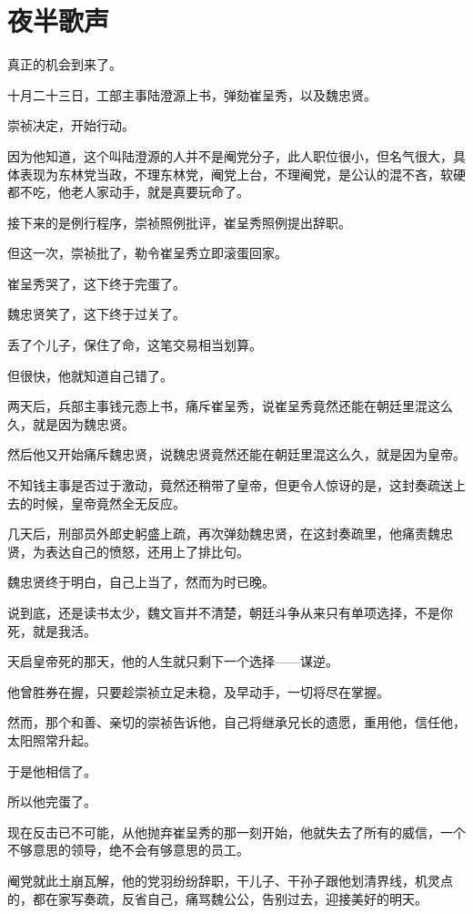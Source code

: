 \section{夜半歌声}
\ifnum{}
	\begin{multicols}{\theparacolNo}
		\fi
		真正的机会到来了。

		十月二十三日，工部主事陆澄源上书，弹劾崔呈秀，以及魏忠贤。

		崇祯决定，开始行动。

		因为他知道，这个叫陆澄源的人并不是阉党分子，此人职位很小，但名气很大，具体表现为东林党当政，不理东林党，阉党上台，不理阉党，是公认的混不吝，软硬都不吃，他老人家动手，就是真要玩命了。

		接下来的是例行程序，崇祯照例批评，崔呈秀照例提出辞职。

		但这一次，崇祯批了，勒令崔呈秀立即滚蛋回家。

		崔呈秀哭了，这下终于完蛋了。

		魏忠贤笑了，这下终于过关了。

		丢了个儿子，保住了命，这笔交易相当划算。

		但很快，他就知道自己错了。

		两天后，兵部主事钱元悫上书，痛斥崔呈秀，说崔呈秀竟然还能在朝廷里混这么久，就是因为魏忠贤。

		然后他又开始痛斥魏忠贤，说魏忠贤竟然还能在朝廷里混这么久，就是因为皇帝。

		不知钱主事是否过于激动，竟然还稍带了皇帝，但更令人惊讶的是，这封奏疏送上去的时候，皇帝竟然全无反应。

		几天后，刑部员外郎史躬盛上疏，再次弹劾魏忠贤，在这封奏疏里，他痛责魏忠贤，为表达自己的愤怒，还用上了排比句。

		魏忠贤终于明白，自己上当了，然而为时已晚。

		说到底，还是读书太少，魏文盲并不清楚，朝廷斗争从来只有单项选择，不是你死，就是我活。

		天启皇帝死的那天，他的人生就只剩下一个选择——谋逆。

		他曾胜券在握，只要趁崇祯立足未稳，及早动手，一切将尽在掌握。

		然而，那个和善、亲切的崇祯告诉他，自己将继承兄长的遗愿，重用他，信任他，太阳照常升起。

		于是他相信了。

		所以他完蛋了。

		现在反击已不可能，从他抛弃崔呈秀的那一刻开始，他就失去了所有的威信，一个不够意思的领导，绝不会有够意思的员工。

		阉党就此土崩瓦解，他的党羽纷纷辞职，干儿子、干孙子跟他划清界线，机灵点的，都在家写奏疏，反省自己，痛骂魏公公，告别过去，迎接美好的明天。


\end{multicols}
